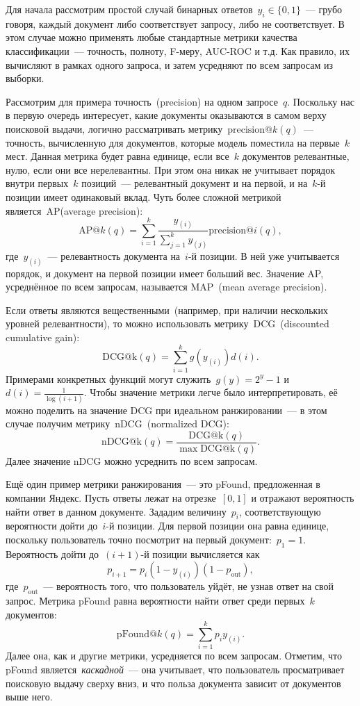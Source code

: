 \documentclass[12pt,fleqn]{article}
\begin{document}
Для начала рассмотрим простой случай бинарных ответов~$y_i \in \{0, 1\}$~---
грубо говоря, каждый документ либо соответствует запросу, либо не соответствует.
В этом случае можно применять любые стандартные метрики качества классификации~---
точность, полноту, F-меру, AUC-ROC и т.д.
Как правило, их вычисляют в рамках одного запроса, и затем усредняют по всем запросам из выборки.

Рассмотрим для примера точность~(precision) на одном запросе~$q$.
Поскольку нас в первую очередь интересует, какие документы оказываются
в самом верху поисковой выдачи, логично рассматривать метрику~$\text{precision}@k(q)$~---
точность, вычисленную для документов, которые модель поместила на первые~$k$ мест.
Данная метрика будет равна единице, если все~$k$ документов релевантные,
нулю, если они все нерелевантны.
При этом она никак не учитывает порядок внутри первых~$k$ позиций~--- релевантный документ
и на первой, и на~$k$-й позиции имеет одинаковый вклад.
Чуть более сложной метрикой является~AP(average precision):
\[
    \text{AP}@k(q)
    =
    \sum_{i = 1}^{k}
        \frac{
            y_{(i)}
        }{
            \sum_{j = 1}^{k} y_{(j)}
        }
        \text{precision}@i(q),
\]
где~$y_{(i)}$~--- релевантность документа на~$i$-й позиции.
В ней уже учитывается порядок, и документ на первой позиции имеет больший вес.
Значение AP, усреднённое по всем запросам, называется MAP~(mean average precision).

Если ответы являются вещественными~(например, при наличии нескольких уровней релевантности),
то можно использовать метрику~DCG~(discounted cumulative gain):
\[
    \text{DCG@k}(q)
    =
    \sum_{i = 1}^{k}
        g(y_{(i)}) d(i).
\]
Примерами конкретных функций могут служить~$g(y) = 2^{y} - 1$ и~$d(i) = \frac{1}{\log(i + 1)}$.
Чтобы значение метрики легче было интерпретировать, её можно поделить на значение DCG
при идеальном ранжировании~--- в этом случае получим метрику~nDCG~(normalized DCG):
\[
    \text{nDCG@k}(q)
    =
    \frac{
        \text{DCG@k}(q)
    }{
        \max \text{DCG@k}(q)
    }.
\]
Далее значение nDCG можно усреднить по всем запросам.

Ещё один пример метрики ранжирования~--- это pFound, предложенная в компании Яндекс.
Пусть ответы лежат на отрезке~$[0, 1]$ и отражают вероятность найти ответ в данном документе.
Зададим величину~$p_i$, соответствующую вероятности дойти до~$i$-й позиции.
Для первой позиции она равна единице, поскольку пользователь точно посмотрит
на первый документ:~$p_1 = 1$.
Вероятность дойти до~$(i+1)$-й позиции вычисляется как
\[
    p_{i + 1}
    =
    p_i
    (1 - y_{(i)})
    (1 - p_\text{out}),
\]
где~$p_\text{out}$~--- вероятность того, что пользователь
уйдёт, не узнав ответ на свой запрос.
Метрика pFound равна вероятности найти ответ среди первых~$k$ документов:
\[
    \text{pFound}@k(q)
    =
    \sum_{i = 1}^{k}
        p_i y_{(i)}.
\]
Далее она, как и другие метрики, усредняется по всем запросам.
Отметим, что pFound является~\emph{каскадной}~---
она учитывает, что пользователь просматривает поисковую выдачу
сверху вниз, и что польза документа зависит от документов выше него.
\end{document}
